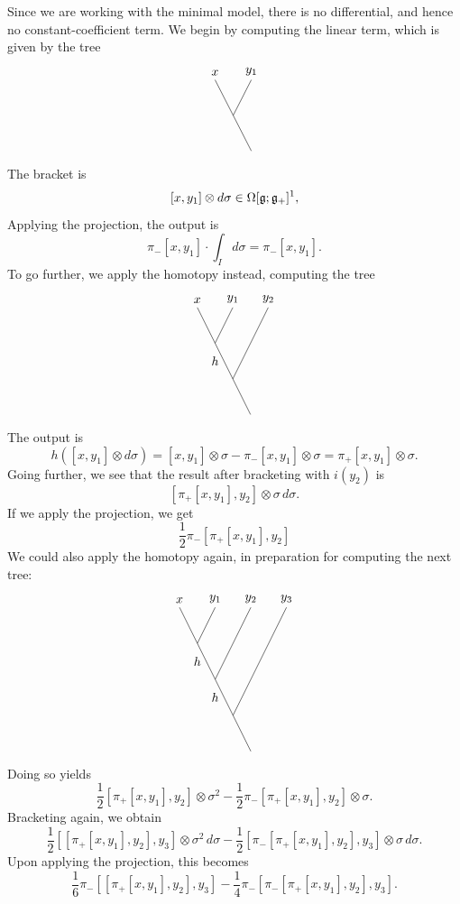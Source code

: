 \documentclass[12pt]{amsart}
\begin{document}
Since we are working with the minimal model, there is no differential, and hence no constant-coefficient term. We begin by computing the linear term, which is given by the tree 
\[
\begin{tikzpicture}
\draw (0,0) node[anchor=south] {$x$};
\draw (1,0) node[anchor=south] {$y_1$};
\draw (0,0) -- (1,-2);
\draw (0.5,-1) -- (1,0);
\end{tikzpicture}
\]
The bracket is
\[
[x,y_1] \otimes d\sigma \in \Omega[\mathfrak g;\mathfrak g_+]^1,
\]
Applying the projection, the output is
\[
\pi_- [x, y_1] \cdot \int_I  d\sigma = \pi_- [x, y_1].
\]
To go further, we apply the homotopy instead, computing the tree
\[
\begin{tikzpicture}
\draw (0,0) node[anchor=south] {$x$};
\draw (1,0) node[anchor=south] {$y_1$};
\draw (2,0) node[anchor=south] {$y_2$};
\draw (0.5, -1.5) node{$h$};
\draw (0,0) -- (1.5,-3);
\draw (0.5,-1) -- (1,0);
\draw (1,-2) -- (2,0);
\end{tikzpicture}
\]
The output is
\[
h( [x,y_1] \otimes d\sigma ) = [x,y_1] \otimes \sigma - \pi_- [x,y_1] \otimes \sigma = \pi_+ [x,y_1] \otimes \sigma.
\]
Going further, we see that the result after bracketing with $i(y_2)$ is
\[
[\pi_+[x,y_1],y_2] \otimes \sigma \, d\sigma.
\]
If we apply the projection, we get 
\[
\frac{1}{2} \pi_- [\pi_+[x,y_1],y_2]
\]
We could also apply the homotopy again, in preparation for computing the next tree:
\[
\begin{tikzpicture}
\draw (0,0) node[anchor=south] {$x$};
\draw (1,0) node[anchor=south] {$y_1$};
\draw (2,0) node[anchor=south] {$y_2$};
\draw (3,0) node[anchor=south] {$y_3$};
\draw (0.5, -1.5) node{$h$};
\draw (1, -2.5) node{$h$};
\draw (0,0) -- (2,-4);
\draw (0.5,-1) -- (1,0);
\draw (1,-2) -- (2,0);
\draw (1.5,-3) -- (3,0);
\end{tikzpicture}
\]
Doing so yields
\[
\frac12 [\pi_+[x,y_1],y_2] \otimes  \sigma^2 - \frac12 \pi_- [\pi_+[x,y_1],y_2] \otimes \sigma.
\]
Bracketing again, we obtain
\[
\frac12 [[\pi_+[x,y_1],y_2], y_3] \otimes \sigma^2\, d\sigma  - \frac12 [\pi_-[\pi_+[x,y_1],y_2], y_3] \otimes \sigma \, d\sigma.
\]
Upon applying the projection, this becomes
\[
\frac16 \pi_- [[\pi_+[x,y_1],y_2], y_3] - \frac14 \pi_- [\pi_-[\pi_+[x,y_1],y_2], y_3].
\]
\end{document}
